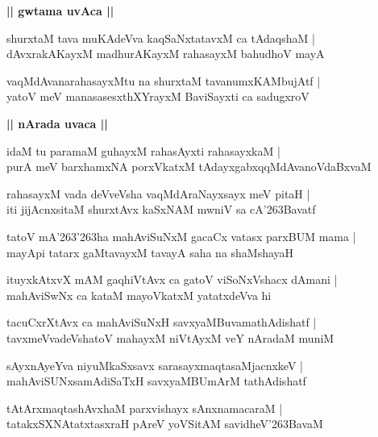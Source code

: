 \documentclass[twoside,12pt,openright]{book}
\def\S{\char'263}
\newcounter{shloka}[chapter]
\def\uvaca#1{\centerline{{\large\textbf{#1}}}}
\begin{document}
\uvaca{|| gwtama uvAca ||}

\begin{shloka}%
shurxtaM tava muKAdeVva kaqSaNxtatavxM  ca tAdaqshaM |\\
dAvxrakAKayxM madhurAKayxM rahasayxM bahudhoV mayA
\end{shloka}

\begin{shloka}%
vaqMdAvanarahasayxMtu na shurxtaM tavanumxKAMbujAtf |\\
yatoV meV manasasesxthXYrayxM BaviSayxti ca sadugxroV 
\end{shloka}

\uvaca{|| nArada uvaca ||}

\begin{shloka}%
idaM tu paramaM guhayxM rahasAyxti rahasayxkaM |\\
purA meV barxhamxNA porxVkatxM tAdayxgabxqqMdAvanoVdaBxvaM  
\end{shloka}

\begin{shloka}%
rahasayxM vada deVveVsha vaqMdAraNayxsayx meV pitaH |\\
iti jijAcnxsitaM shurxtAvx kaSxNAM mwniV sa cA\S Bavatf 
\end{shloka}

\begin{shloka}%
tatoV mA\S \S ha mahAviSuNxM gacaCx vatasx parxBUM mama |\\
mayApi tatarx gaMtavayxM tavayA saha na shaMshayaH 
\end{shloka}

\begin{shloka}%
ituyxkAtxvX mAM gaqhiVtAvx ca gatoV viSoNxVshacx dAmani |\\
mahAviSwNx ca kataM mayoVkatxM yatatxdeVva hi
\end{shloka}

\begin{shloka}%
tacuCxrXtAvx ca mahAviSuNxH savxyaMBuvamathAdishatf |\\
tavxmeVvadeVshatoV mahayxM niVtAyxM veY nAradaM muniM 
\end{shloka}

\begin{shloka}%
sAyxnAyeYva niyuMkaSxsavx sarasayxmaqtasaMjacnxkeV |\\
mahAviSUNxsamAdiSaTxH savxyaMBUmArM tathAdishatf
\end{shloka}

\begin{shloka}%
tAtArxmaqtashAvxhaM parxvishayx sAnxnamacaraM |\\
tatakxSXNAtatxtasxraH pAreV yoVSitAM savidheV\S BavaM 
\end{shloka}
\end{document}

